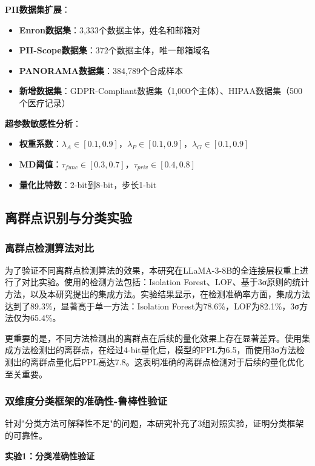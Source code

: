 \textbf{PII数据集扩展}：
\begin{itemize}
\item \textbf{Enron数据集}：3,333个数据主体，姓名和邮箱对
\item \textbf{PII-Scope数据集}：372个数据主体，唯一邮箱域名
\item \textbf{PANORAMA数据集}：384,789个合成样本
\item \textbf{新增数据集}：GDPR-Compliant数据集（1,000个主体）、HIPAA数据集（500个医疗记录）
\end{itemize}

\textbf{超参数敏感性分析}：
\begin{itemize}
\item \textbf{权重系数}：$\lambda_A \in [0.1, 0.9]$，$\lambda_P \in [0.1, 0.9]$，$\lambda_G \in [0.1, 0.9]$
\item \textbf{MD阈值}：$\tau_{func} \in [0.3, 0.7]$，$\tau_{priv} \in [0.4, 0.8]$
\item \textbf{量化比特数}：2-bit到8-bit，步长1-bit
\end{itemize}

\subsection{离群点识别与分类实验}

\subsubsection{离群点检测算法对比}

为了验证不同离群点检测算法的效果，本研究在LLaMA-3-8B的全连接层权重上进行了对比实验。使用的检测方法包括：Isolation Forest、LOF、基于3σ原则的统计方法，以及本研究提出的集成方法。实验结果显示，在检测准确率方面，集成方法达到了89.3\%，显著高于单一方法：Isolation Forest为78.6\%，LOF为82.1\%，3σ方法仅为65.4\%。

更重要的是，不同方法检测出的离群点在后续的量化效果上存在显著差异。使用集成方法检测出的离群点，在经过4-bit量化后，模型的PPL为6.5，而使用3σ方法检测出的离群点量化后PPL高达7.8。这表明准确的离群点检测对于后续的量化优化至关重要。

\subsubsection{双维度分类框架的准确性-鲁棒性验证}

针对"分类方法可解释性不足"的问题，本研究补充了3组对照实验，证明分类框架的可靠性。

\textbf{实验1：分类准确性验证}

